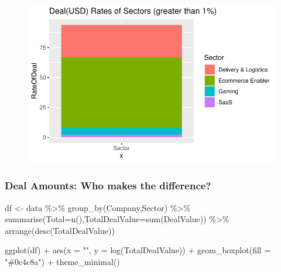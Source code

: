 \documentclass[
  letterpaper,
  DIV=11,
  numbers=noendperiod]{scrreprt}
\newenvironment{Shaded}{\begin{snugshade}}{\end{snugshade}}
\newcommand{\AttributeTok}[1]{\textcolor[rgb]{0.40,0.45,0.13}{#1}}
\newcommand{\FunctionTok}[1]{\textcolor[rgb]{0.28,0.35,0.67}{#1}}
\newcommand{\NormalTok}[1]{\textcolor[rgb]{0.00,0.23,0.31}{#1}}
\newcommand{\OtherTok}[1]{\textcolor[rgb]{0.00,0.23,0.31}{#1}}
\newcommand{\SpecialCharTok}[1]{\textcolor[rgb]{0.37,0.37,0.37}{#1}}
\newcommand{\StringTok}[1]{\textcolor[rgb]{0.13,0.47,0.30}{#1}}
\begin{document}
\begin{figure}[H]

{\centering \includegraphics{./assignment1_files/figure-pdf/unnamed-chunk-5-1.pdf}

}

\end{figure}

\hypertarget{deal-amounts-who-makes-the-difference}{%
\subsubsection{Deal Amounts: Who makes the
difference?}\label{deal-amounts-who-makes-the-difference}}

\begin{Shaded}
\begin{Highlighting}[]
\NormalTok{df }\OtherTok{\textless{}{-}}\NormalTok{  data }\SpecialCharTok{\%\textgreater{}\%}
  \FunctionTok{group\_by}\NormalTok{(Company,Sector) }\SpecialCharTok{\%\textgreater{}\%}
  \FunctionTok{summarise}\NormalTok{(}\AttributeTok{Total=}\FunctionTok{n}\NormalTok{(),}\AttributeTok{TotalDealValue=}\FunctionTok{sum}\NormalTok{(DealValue))  }\SpecialCharTok{\%\textgreater{}\%}
  \FunctionTok{arrange}\NormalTok{(}\FunctionTok{desc}\NormalTok{(TotalDealValue))}

\FunctionTok{ggplot}\NormalTok{(df) }\SpecialCharTok{+}
  \FunctionTok{aes}\NormalTok{(}\AttributeTok{x =} \StringTok{""}\NormalTok{, }\AttributeTok{y =} \FunctionTok{log}\NormalTok{(TotalDealValue)) }\SpecialCharTok{+}
  \FunctionTok{geom\_boxplot}\NormalTok{(}\AttributeTok{fill =} \StringTok{"\#0c4c8a"}\NormalTok{) }\SpecialCharTok{+}
  \FunctionTok{theme\_minimal}\NormalTok{()}
\end{Highlighting}
\end{Shaded}
\end{document}
